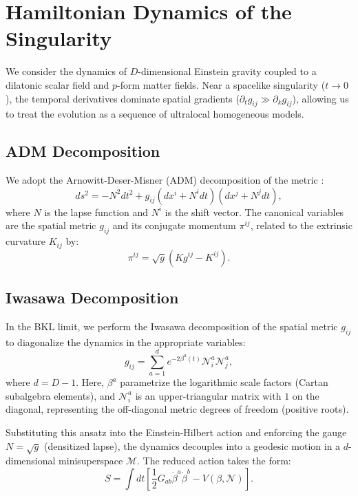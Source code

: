 \documentclass[aps,prd,reprint,nofootinbib,amsmath,amssymb,amsfonts]{revtex4-2}
\begin{document}
\section{Hamiltonian Dynamics of the Singularity}
\label{sec:hamiltonian}

We consider the dynamics of $D$-dimensional Einstein gravity coupled to a dilatonic scalar field and $p$-form matter fields. Near a spacelike singularity ($t \to 0$), the temporal derivatives dominate spatial gradients ($\partial_t g_{ij} \gg \partial_k g_{ij}$), allowing us to treat the evolution as a sequence of ultralocal homogeneous models.

\subsection{ADM Decomposition}

We adopt the Arnowitt-Deser-Misner (ADM) decomposition of the metric \cite{HenneauxTeitelboim1992}:
\begin{equation}
    ds^2 = -N^2 dt^2 + g_{ij} (dx^i + N^i dt)(dx^j + N^j dt),
\end{equation}
where $N$ is the lapse function and $N^i$ is the shift vector. The canonical variables are the spatial metric $g_{ij}$ and its conjugate momentum $\pi^{ij}$, related to the extrinsic curvature $K_{ij}$ by:
\begin{equation}
    \pi^{ij} = \sqrt{g}(K g^{ij} - K^{ij}).
\end{equation}

\subsection{Iwasawa Decomposition}

In the BKL limit, we perform the Iwasawa decomposition of the spatial metric $g_{ij}$ to diagonalize the dynamics in the appropriate variables:
\begin{equation}
    g_{ij} = \sum_{a=1}^{d} e^{-2\beta^a(t)} \mathcal{N}^a_i \mathcal{N}^a_j,
\end{equation}
where $d = D-1$. Here, $\beta^a$ parametrize the logarithmic scale factors (Cartan subalgebra elements), and $\mathcal{N}^a_i$ is an upper-triangular matrix with $1$ on the diagonal, representing the off-diagonal metric degrees of freedom (positive roots).

Substituting this ansatz into the Einstein-Hilbert action and enforcing the gauge $N = \sqrt{g}$ (densitized lapse), the dynamics decouples into a geodesic motion in a $d$-dimensional minisuperspace $\mathcal{M}$. The reduced action takes the form:
\begin{equation}
    S = \int dt \left[ \frac{1}{2} G_{ab} \dot{\beta}^a \dot{\beta}^b - V(\beta, \mathcal{N}) \right].
    \label{eq:reduced_action}
\end{equation}
\end{document}
